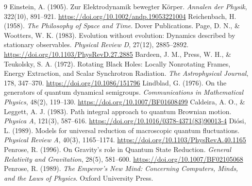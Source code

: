 \documentclass[11pt,a4paper]{article}
\begin{document}
\begin{thebibliography}{9}
 Einstein, A. (1905). Zur Elektrodynamik bewegter Körper. \emph{Annalen der Physik}, 322(10), 891--921. \url{https://doi.org/10.1002/andp.19053221004}
 Reichenbach, H. (1958). \emph{The Philosophy of Space and Time}. Dover Publications.
 Page, D. N., \& Wootters, W. K. (1983). Evolution without evolution: Dynamics described by stationary observables. \emph{Physical Review D}, 27(12), 2885--2892. \url{https://doi.org/10.1103/PhysRevD.27.2885}
 Bardeen, J. M., Press, W. H., \& Teukolsky, S. A. (1972). Rotating Black Holes: Locally Nonrotating Frames, Energy Extraction, and Scalar Synchrotron Radiation. \emph{The Astrophysical Journal}, 178, 347--370. \url{https://doi.org/10.1086/151796}
 Lindblad, G. (1976). On the generators of quantum dynamical semigroups. \emph{Communications in Mathematical Physics}, 48(2), 119--130. \url{https://doi.org/10.1007/BF01608499}
 Caldeira, A. O., \& Leggett, A. J. (1983). Path integral approach to quantum Brownian motion. \emph{Physica A}, 121(3), 587--616. \url{https://doi.org/10.1016/0378-4371(83)90013-4}
 Diósi, L. (1989). Models for universal reduction of macroscopic quantum fluctuations. \emph{Physical Review A}, 40(3), 1165--1174. \url{https://doi.org/10.1103/PhysRevA.40.1165}
 Penrose, R. (1996). On Gravity's role in Quantum State Reduction. \emph{General Relativity and Gravitation}, 28(5), 581--600. \url{https://doi.org/10.1007/BF02105068}
 Penrose, R. (1989). \emph{The Emperor's New Mind: Concerning Computers, Minds, and the Laws of Physics}. Oxford University Press.
\end{thebibliography}
\end{document}
